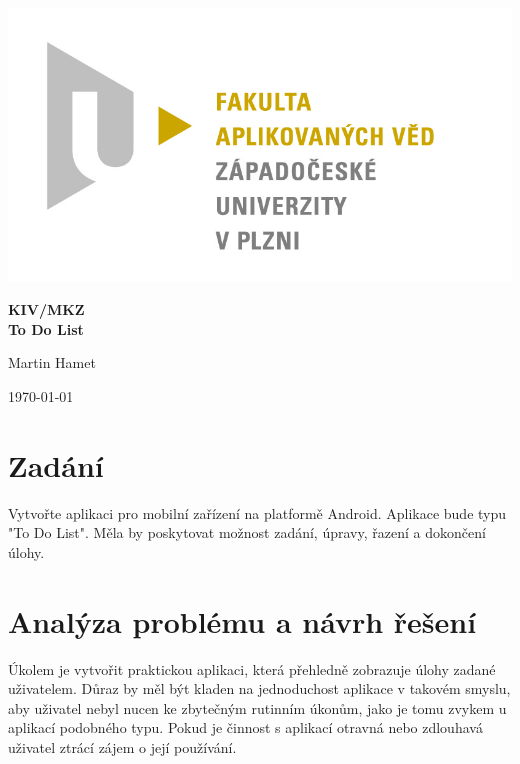 \documentclass[12pt]{article}
\begin{document}
\begin{titlepage}
\includegraphics[scale=0.2, trim=5cm 0 0 30cm]{logo.jpg}
\begin{center}
\vspace{5cm}
{\Huge
\textbf{KIV/MKZ}\\
\vspace{1cm}
}
{\Large
\textbf{To Do List}
}
\end{center}
\vspace{\fill}

\begin{minipage}[t]{5cm}
\flushleft
Martin Hamet\\
\end{minipage}
\hfill
\begin{minipage}[t]{7cm}
\flushright
\today
\end{minipage}
\end{titlepage}

\tableofcontents
\newpage
\section{Zadání}
\label{zadani}
Vytvořte aplikaci pro mobilní zařízení na platformě Android. Aplikace bude typu "To Do List". Měla by poskytovat možnost zadání, úpravy, řazení a dokončení úlohy.

\section{Analýza problému a návrh řešení}
Úkolem je vytvořit praktickou aplikaci, která přehledně zobrazuje úlohy zadané uživatelem. Důraz by měl být kladen na jednoduchost aplikace v takovém smyslu, aby uživatel nebyl nucen ke zbytečným rutinním úkonům, jako je tomu zvykem u aplikací podobného typu. Pokud je činnost s aplikací otravná nebo zdlouhavá uživatel ztrácí zájem o její používání.
\end{document}
